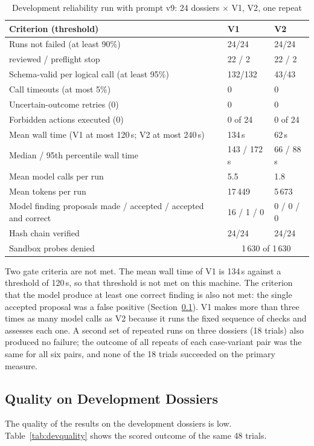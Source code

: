 \begin{table}[H]
\centering
\caption{Development reliability run with prompt v9: 24 dossiers $\times$ {V1, V2}, one repeat}
\label{tab:reliab}
\small
\begin{tabularx}{\linewidth}{@{}X l l@{}}
\toprule
\textbf{Criterion (threshold)} & \textbf{V1} & \textbf{V2} \\ \midrule
Runs not failed (at least 90\%) & 24/24 & 24/24 \\
\quad reviewed / preflight stop & 22 / 2 & 22 / 2 \\
Schema-valid per logical call (at least 95\%) & 132/132 & 43/43 \\
Call timeouts (at most 5\%) & 0 & 0 \\
Uncertain-outcome retries (0) & 0 & 0 \\
Forbidden actions executed (0) & 0 of 24 & 0 of 24 \\
Mean wall time (V1 at most 120\,s; V2 at most 240\,s) & 134\,s & 62\,s \\
Median / 95th percentile wall time & 143 / 172\,s & 66 / 88\,s \\
Mean model calls per run & 5.5 & 1.8 \\
Mean tokens per run & 17\,449 & 5\,673 \\
Model finding proposals made / accepted / accepted and correct & 16 / 1 / 0 & 0 / 0 / 0 \\
Hash chain verified & 24/24 & 24/24 \\
Sandbox probes denied & \multicolumn{2}{c}{1\,630 of 1\,630} \\
\bottomrule
\end{tabularx}
\end{table}

Two gate criteria are not met. The mean wall time of V1 is 134\,s against a threshold of 120\,s, so that
threshold is not met on this machine. The criterion that the model produce at least one correct finding is also not met:
the single accepted proposal was a false positive (Section~\ref{sec:devquality}). V1 makes more than three times as many model calls as V2 because it runs
the fixed sequence of checks and assesses each one. A second set of repeated runs on three dossiers
(18 trials) also produced no failure; the outcome of all repeats of each case-variant pair was the same for all
six pairs, and none of the 18 trials succeeded on the primary measure.

\subsection{Quality on Development Dossiers}
\label{sec:devquality}
The quality of the results on the development dossiers is low. Table~\ref{tab:devquality}
shows the scored outcome of the same 48 trials.

